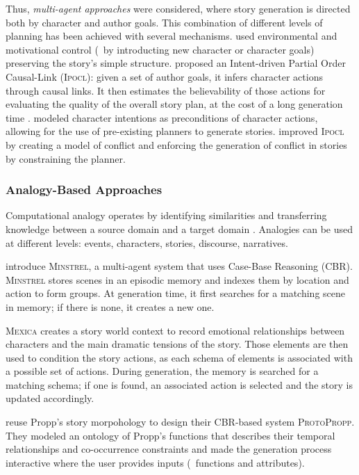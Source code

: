 Thus, \emph{multi-agent approaches} were considered, where story generation is directed both by character and author goals. This combination of different levels of planning has been achieved with several mechanisms. \citet{theune2003virtual} used environmental and motivational control (\eg\ by introducting new character or character goals) preserving the story's simple structure. \citet{riedl2004intent} proposed an Intent-driven Partial Order Causal-Link (\textsc{Ipocl}): given a set of author goals, it infers character actions through causal links. It then estimates the believability of those actions for evaluating the quality of the overall story plan, at the cost of a long generation time \citep{riedl2010narrative}. \citet{haslum2012narrative} modeled character intentions as preconditions of character actions, allowing for the use of pre-existing planners to generate stories. \citet{ware2011cpocl} improved \textsc{Ipocl} by creating a model of conflict and enforcing the generation of conflict in stories by constraining the planner.

\subsubsection{Analogy-Based Approaches}
Computational analogy operates by identifying similarities and transferring knowledge between a source domain and a target domain \citep{zhu2010towards}. Analogies can be used at different levels: events, characters, stories, discourse, narratives.

\citet{turner1993minstrel} introduce \textsc{Minstrel}, a multi-agent system that uses Case-Base Reasoning (\textsc{CBR}). \textsc{Minstrel} stores scenes in an episodic memory and indexes them by location and action to form groups. At generation time, it first searches for a matching scene in memory; if there is none, it creates a new one.

\textsc{Mexica} \citep{perez2001mexica} creates a story world context to record emotional relationships between characters and the main dramatic tensions of the story. Those elements are then used to condition the story actions, as each schema of elements is associated with a possible set of actions. During generation, the memory is searched for a matching schema; if one is found, an associated action is selected and the story is updated accordingly.

\citet{gervas2004story} reuse Propp's story morpohology to design their \textsc{CBR}-based system \textsc{ProtoPropp}. They modeled an ontology of Propp's functions that describes their temporal relationships and co-occurrence constraints and made the generation process interactive where the user provides inputs (\eg\ functions and attributes).


